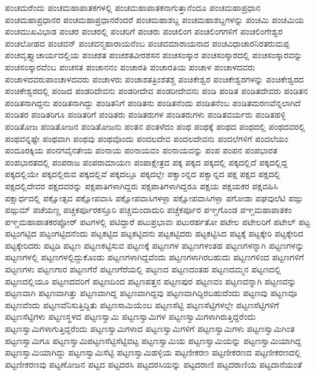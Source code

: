 {ಪಂಚಮರೆಂದು
ಪಂಚಮಹಾಪಾತಕಗಳಲ್ಲಿ
ಪಂಚಮಹಾಪಾತಕನಾಗುತ್ತಾನೆಂದೂ
ಪಂಚಮಹಾಪ್ರಧಾನ
ಪಂಚಮಹಾಪ್ರಧಾನರ
ಪಂಚಮಹಾಪ್ರಧಾನರೆಂದರೆ
ಪಂಚಮಹಾಶಬ್ದ
ಪಂಚಮಹಾಶಬ್ದಗಳನ್ನು
ಪಂಚಮಿ
ಪಂಚಮಿಯ
ಪಂಚಮುಖವಿಭಾಡ
ಪಂಚರ
ಪಂಚರಲ್ಲಿ
ಪಂಚರಿಗೆ
ಪಂಚರು
ಪಂಚಲಿಂಗ
ಪಂಚಲಿಂಗಗಳಿಗೆ
ಪಂಚಲಿಂಗೇಶ್ವರ
ಪಂಚಲೋಹದ
ಪಂಚವನ್
ಪಂಚವನ್ಮಹಾರಾಯನೆಂಬ
ಪಂಚವಮಾರಾಯನಾದ
ಪಂಚವಿಧಾಚಾರನಿರತರುಮಪ್ಪ
ಪಂಚವೃತ್ತ್ಯಾಚಾರ್ಯದಲ್ಲಿಯ
ಪಂಚಶತ
ಪಂಚಶತವೀರಶಸನ
ಪಂಚಸಂಸ್ಕಾರ
ಪಂಚಸಂಸ್ಕಾರದಲ್ಲಿ
ಪಂಚಸಂಸ್ಕಾರವನ್ನು
ಪಂಚಸಂಸ್ಕಾರವೆಂಬ
ಪಂಚಸತ
ಪಂಚಾನನಂ
ಪಂಚಾರತಿ
ಪಂಚಾರತಿಯ
ಪಂಚಾಳ
ಪಂಚಾಳದವರು
ಪಂಚಾಳದವರುಪಾಂಚಾಳದವರು
ಪಂಚಾಳರು
ಪಂಚಾಶತತ್ರಿಂಶತಶ್ಚ
ಪಂಚಿಕೇಶ್ವರ
ಪಂಚಿಕೇಶ್ವರಗಳನ್ನು
ಪಂಚಿಕೇಶ್ವರದ
ಪಂಚಿಕೇಶ್ವರದಲ್ಲಿ
ಪಂಜದ
ಪಂಡರಿದೇವನು
ಪಂಡರೀದೇವ
ಪಂಡರೀದೇವನು
ಪಂಡಿ
ಪಂಡಿತ
ಪಂಡಿತದೇವರು
ಪಂಡಿತನ
ಪಂಡಿತನಾಗಿದ್ದನು
ಪಂಡಿತನಾಗಿದ್ದು
ಪಂಡಿತನಿಗೆ
ಪಂಡಿತನು
ಪಂಡಿತನೆಂದು
ಪಂಡಿತನೆಂಬ
ಪಂಡಿತಮರಣವೆನ್ನಲಾಗಿದೆ
ಪಂಡಿತರ
ಪಂಡಿತರಿಗೂ
ಪಂಡಿತರಿಗೆ
ಪಂಡಿತರು
ಪಂಡಿತರುಗಳ
ಪಂಡಿತರುಗಳು
ಪಂಡಿತವರ್ಯರು
ಪಂಡಿತಹಳ್ಳಿ
ಪಂಡಿತೋಜ
ಪಂಡಿತೋಜನ
ಪಂಡಿತೋಜನು
ಪಂತನ
ಪಂತಳೆದಂ
ಪಂಥ
ಪಂಥಕ್ಕೆ
ಪಂಥದ
ಪಂಥದಲ್ಲಿ
ಪಂಥದವರಲ್ಲಿ
ಪಂಥವನ್ನಷ್ಟೇ
ಪಂಥವಾಗಿ
ಪಂಥವು
ಪಂಥವೊಂದು
ಪಂದಲದೇವ
ಪಂದಲದೇವನು
ಪಂದಲೆಗಳಿಗೆ
ಪಂದಲೆಯಂ
ಪಂದೂರಕ್ಕಿಯ
ಪಂನಗವೈನತೇಯ
ಪಂನಾಯ
ಪಂನಾಯವಂ
ಪಂನಾಯವನ್ನು
ಪಂಪ
ಪಂಪನ
ಪಂಪಭಾರತ
ಪಂಪಭಾರತದಲ್ಲಿ
ಪಂಪರಾಜ
ಪಂಪರಾಮಾಯಣ
ಪಂಪಾಕ್ಷೇತ್ರದ
ಪಕ್ಕ
ಪಕ್ಕದ
ಪಕ್ಕದಲ್ಲಿ
ಪಕ್ಕದಲ್ಲಿದೆ
ಪಕ್ಕದಲ್ಲಿದ್ದ
ಪಕ್ಕದಲ್ಲಿಯೇ
ಪಕ್ಕದಲ್ಲಿರುವ
ಪಕ್ಕದಲ್ಲಿವೆ
ಪಕ್ಕದಲ್ಲೂ
ಪಕ್ಕದಲ್ಲೇ
ಪಕ್ವಾಂನ್ನದ
ಪಕ್ವಾನ್ನದ
ಪಕ್ಷ
ಪಕ್ಷದ
ಪಕ್ಷದಲ್ಲಿ
ಪಕ್ಷದಲ್ಲಿದೇವರ
ಪಕ್ಷದವರನ್ನು
ಪಕ್ಷಪಾತಿಗಳಾಗಿದ್ದರು
ಪಕ್ಷಪಾತಿಗಳಾಗಿದ್ದರೂ
ಪಕ್ಷಯ
ಪಕ್ಷಯಕರ
ಪಕ್ಷವಹಿಸಿ
ಪಕ್ಷಾರ್ಧದಲ್ಲಿ
ಪಕ್ಷೋತ್ಸವ
ಪಕ್ಷೋಪವಾಸಿ
ಪಕ್ಷೋಪವಾಸಿಗಳಳ್ಪಾ
ಪಕ್ಷೋಪವಾಸಿಗಳ್ಪಾ
ಪಗೋಡಾ
ಪಘವುಲೆಟಿ
ಪಙ್ಗು
ಪಙ್ಗುಮ್
ಪಚೆಯಣ್ಣ
ಪಚ್ಚಕರ್ಪೂರಕಸ್ತೂರಿ
ಪಚ್ಚಮಂದಾದುರಿ
ಪಚ್ಚೆಕರ್ಪೂರ
ಪಞ್ಚಗೊಂಡ
ಪಞ್ಚಮಹಾಪಾತಕಂ
ಪಞ್ಚಮಹಾಪಾತಕರಪ್ಪೋರ್
ಪಟಗಳಲ್ಲಿ
ಪಟಿದ್ದಾರೆ
ಪಟುಪ್ರಭಾವಃ
ಪಟುರರ್ಹತೋ
ಪಟೇಲ
ಪಟೇಲರಿಗೆ
ಪಟೇಲ್
ಪಟ್ಟ
ಪಟ್ಟಂಗಟ್ಟಿದ
ಪಟ್ಟಂಗಟ್ಟಿದನೆಂದು
ಪಟ್ಟಕಟ್ಟಿದ
ಪಟ್ಟಕಟ್ಟಿದನು
ಪಟ್ಟಕಟ್ಟಿದರು
ಪಟ್ಟಕಟ್ಟಿಸಿದ
ಪಟ್ಟಕ್ಕೆ
ಪಟ್ಟಕ್ಕೇರಿ
ಪಟ್ಟಕ್ಕೇರಿದ
ಪಟ್ಟಕ್ಕೇರಿದರು
ಪಟ್ಟಡಿ
ಪಟ್ಟಣ
ಪಟ್ಟಣಕಟ್ಟಿಸುವ
ಪಟ್ಟಣಕ್ಕೆ
ಪಟ್ಟಣಗಳ
ಪಟ್ಟಣಗಳಂತಹ
ಪಟ್ಟಣಗಳನ್ನಾಗಿ
ಪಟ್ಟಣಗಳನ್ನು
ಪಟ್ಟಣಗಳಲ್ಲಿ
ಪಟ್ಟಣಗಳಲ್ಲಿದ್ದುಕೊಂಡು
ಪಟ್ಟಣಗಳಾಗಿದ್ದವೆಂದು
ಪಟ್ಟಣಗಳಾಗಿರಬಹುದು
ಪಟ್ಟಣಗಳಿಂದ
ಪಟ್ಟಣಗಳಿಗೆ
ಪಟ್ಟಣಗಳು
ಪಟ್ಟಣಗಾರ
ಪಟ್ಟಣಗೆರೆ
ಪಟ್ಟಣಗೆರೆಯಲ್ಲಿ
ಪಟ್ಟಣದ
ಪಟ್ಟಣದಂತಹ
ಪಟ್ಟಣದಮ್ಮನ
ಪಟ್ಟಣದಲ್ಲಿ
ಪಟ್ಟಣದಲ್ಲಿಯೂ
ಪಟ್ಟಣದವರಿಗೆ
ಪಟ್ಟಣದಿಂದ
ಪಟ್ಟಣಪತ್ತನ
ಪಟ್ಟಣಪುರ
ಪಟ್ಟಣವಂ
ಪಟ್ಟಣವನ್ನಾಗಿ
ಪಟ್ಟಣವನ್ನು
ಪಟ್ಟಣವಾಗಿ
ಪಟ್ಟಣವಾಗಿತ್ತು
ಪಟ್ಟಣವಾಗಿದ್ದ
ಪಟ್ಟಣವಾಗಿದ್ದವು
ಪಟ್ಟಣವಾಗಿದ್ದಿರಬಹುದೆಂದು
ಪಟ್ಟಣವು
ಪಟ್ಟಣವೂ
ಪಟ್ಟಣವೆಂದು
ಪಟ್ಟಣವೆನಿಸುತ್ತಿದ್ದಿತು
ಪಟ್ಟಣಸಾಮಿಯೆಂಬ
ಪಟ್ಟಣಸೆಟ್ಟಿ
ಪಟ್ಟಣಸೆಟ್ಟಿಗಳಲ್ಲೇ
ಪಟ್ಟಣಸೆಟ್ಟಿಗಳಿಗೆ
ಪಟ್ಟಣಸೆಟ್ಟಿಗಳು
ಪಟ್ಟಣಸ್ಥಳದ
ಪಟ್ಟಣಸ್ವಾಮಿ
ಪಟ್ಟಣಸ್ವಾಮಿಗಳ
ಪಟ್ಟಣಸ್ವಾಮಿಗಳಾಗಿರುತ್ತಿದ್ದರೆಂದು
ಪಟ್ಟಣಸ್ವಾಮಿಗಳಾಗುತ್ತಿದ್ದರೆಂದು
ಪಟ್ಟಣಸ್ವಾಮಿಗಳಾದ
ಪಟ್ಟಣಸ್ವಾಮಿಗಳಿಗೆ
ಪಟ್ಟಣಸ್ವಾಮಿಗಳು
ಪಟ್ಟಣಸ್ವಾಮಿಗಿಂತ
ಪಟ್ಟಣಸ್ವಾಮಿಗೂ
ಪಟ್ಟಣಸ್ವಾಮಿಪಟ್ಟಣಸೆಟ್ಟಿಸೆಟ್ಟಿವಟ್ಟ
ಪಟ್ಟಣಸ್ವಾಮಿಯ
ಪಟ್ಟಣಸ್ವಾಮಿಯನ್ನು
ಪಟ್ಟಣಸ್ವಾಮಿಯಾಗಿದ್ದ
ಪಟ್ಟಣಸ್ವಾಮಿಯಾಗಿದ್ದು
ಪಟ್ಟಣಸ್ವಾಮಿಸೆಟ್ಟಿ
ಪಟ್ಟಣಸ್ವಾಮಿಹಳ್ಳಿಯ
ಪಟ್ಟಣೀಕರಣ
ಪಟ್ಟಣೀಕರಣದ
ಪಟ್ಟಣೀಕರಣದಲ್ಲಿ
ಪಟ್ಟಣೀಕರಣವು
ಪಟ್ಟಣೋಜನ
ಪಟ್ಟದ
ಪಟ್ಟದರಸಿ
ಪಟ್ಟದರಸಿಯನ್ನು
ಪಟ್ಟದರಾಣಿ
ಪಟ್ಟದರಾಣಿಯ
ಪಟ್ಟದಾನೆಯಂತೆ
}
